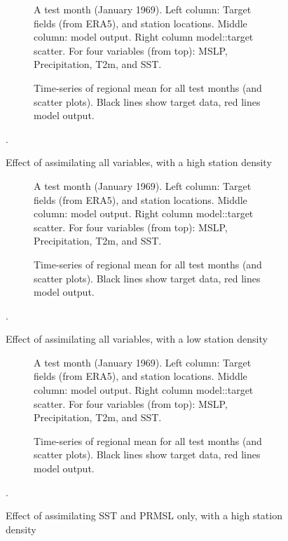 \documentclass[a4paper,12pt]{article}
\begin{document}
\pagebreak
\begin{figure}[h]
\begin{subfigure}{1.0\textwidth}    
\caption{A test month (January 1969). Left column: Target fields (from ERA5), and station locations. Middle column: model output. Right column model::target scatter. For four variables (from top): MSLP, Precipitation, T2m, and SST.}
\end{subfigure}
\begin{subfigure}{1.0\textwidth}    
\caption{Time-series of regional mean for all test months (and scatter plots). Black lines show target data, red lines model output.}
\end{subfigure}
\caption{Effect of assimilating all variables, with a high station density}.
\label{All_05}
\end{figure}
    
     
\pagebreak
\begin{figure}[h]
\begin{subfigure}{1.0\textwidth}    
\caption{A test month (January 1969). Left column: Target fields (from ERA5), and station locations. Middle column: model output. Right column model::target scatter. For four variables (from top): MSLP, Precipitation, T2m, and SST.}
\end{subfigure}
\begin{subfigure}{1.0\textwidth}    
\caption{Time-series of regional mean for all test months (and scatter plots). Black lines show target data, red lines model output.}
\end{subfigure}
\caption{Effect of assimilating all variables, with a low station density}.
\label{All_20}
\end{figure}

    
\pagebreak
\begin{figure}[h]
\begin{subfigure}{1.0\textwidth}    
\caption{A test month (January 1969). Left column: Target fields (from ERA5), and station locations. Middle column: model output. Right column model::target scatter. For four variables (from top): MSLP, Precipitation, T2m, and SST.}
\end{subfigure}
\begin{subfigure}{1.0\textwidth}    
\caption{Time-series of regional mean for all test months (and scatter plots). Black lines show target data, red lines model output.}
\end{subfigure}
\caption{Effect of assimilating SST and PRMSL only, with a high station density}.
\label{SST+PRMSL_05}
\end{figure}
\end{document}
